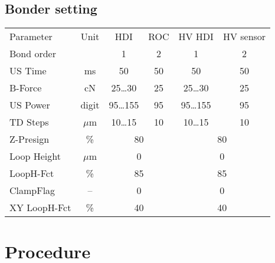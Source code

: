 \documentclass[12pt]{unlsilabsop}
\begin{document}
\subsection{Bonder setting}

\begin{tabular}{lc|cc|cc}
\toprule
Parameter & Unit & HDI & ROC & HV HDI & HV sensor \\
\multicolumn{2}{l|}{Bond order} & 1 & 2 & 1 & 2 \\
    \midrule
US Time      &  ms    & 50         & 50 & 50         & 50  \\
B-Force      &  cN    & 25\dots30  & 25 & 25\dots30  & 25 \\
US Power     & digit  & 95\dots155 & 95 & 95\dots155 & 95 \\
TD Steps     & $\mu$m & 10\dots15  & 10 & 10\dots15  & 10 \\
    \midrule
Z-Presign    & \%     & \multicolumn{2}{|c|}{80} & \multicolumn{2}{|c|}{80} \\
Loop Height  & $\mu$m & \multicolumn{2}{|c|}{0 } & \multicolumn{2}{|c|}{0 } \\
LoopH-Fct    & \%     & \multicolumn{2}{|c|}{85} & \multicolumn{2}{|c|}{85} \\
ClampFlag    & --     & \multicolumn{2}{|c|}{0 } & \multicolumn{2}{|c|}{0 } \\
XY LoopH-Fct & \%     & \multicolumn{2}{|c|}{40} & \multicolumn{2}{|c|}{40} \\
   \bottomrule
\end{tabular}

\section{Procedure}
\end{document}
